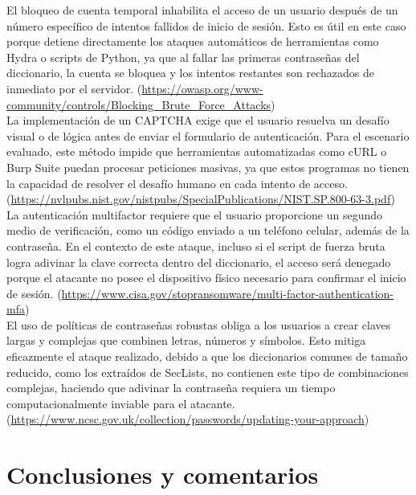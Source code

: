 \documentclass[letter,12pt]{article}
\begin{document}
El bloqueo de cuenta temporal inhabilita el acceso de un usuario después de un número específico de intentos fallidos de inicio de sesión. Esto es útil en este caso porque detiene directamente los ataques automáticos de herramientas como Hydra o scripts de Python, ya que al fallar las primeras contraseñas del diccionario, la cuenta se bloquea y los intentos restantes son rechazados de inmediato por el servidor. (\url{https://owasp.org/www-community/controls/Blocking_Brute_Force_Attacks})\\



La implementación de un CAPTCHA exige que el usuario resuelva un desafío visual o de lógica antes de enviar el formulario de autenticación. Para el escenario evaluado, este método impide que herramientas automatizadas como cURL o Burp Suite puedan procesar peticiones masivas, ya que estos programas no tienen la capacidad de resolver el desafío humano en cada intento de acceso. (\url{https://nvlpubs.nist.gov/nistpubs/SpecialPublications/NIST.SP.800-63-3.pdf})\\



La autenticación multifactor requiere que el usuario proporcione un segundo medio de verificación, como un código enviado a un teléfono celular, además de la contraseña. En el contexto de este ataque, incluso si el script de fuerza bruta logra adivinar la clave correcta dentro del diccionario, el acceso será denegado porque el atacante no posee el dispositivo físico necesario para confirmar el inicio de sesión. (\url{https://www.cisa.gov/stopransomware/multi-factor-authentication-mfa})\\



El uso de políticas de contraseñas robustas obliga a los usuarios a crear claves largas y complejas que combinen letras, números y símbolos. Esto mitiga eficazmente el ataque realizado, debido a que los diccionarios comunes de tamaño reducido, como los extraídos de SecLists, no contienen este tipo de combinaciones complejas, haciendo que adivinar la contraseña requiera un tiempo computacionalmente inviable para el atacante. (\url{https://www.ncsc.gov.uk/collection/passwords/updating-your-approach})

\section*{Conclusiones y comentarios}
\end{document}
